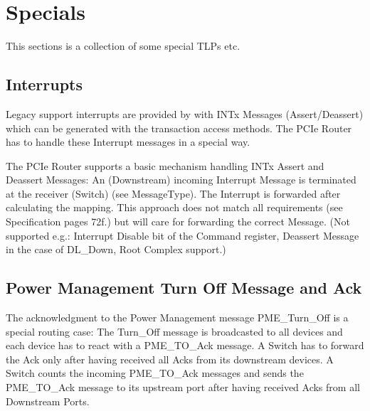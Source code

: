 \section{Specials}
\label{sec:Specials}

This sections is a collection of some special TLPs etc.

\subsection{Interrupts}
Legacy support interrupts are provided by with INTx Messages (Assert/Deassert) which can be generated with the transaction access methods. The PCIe Router has to handle these Interrupt messages in a special way.

The PCIe Router supports a basic mechanism handling INTx Assert and Deassert Messages: An (Downstream) incoming Interrupt Message is terminated at the receiver (Switch) (see MessageType). The Interrupt is forwarded after calculating the mapping. This approach does not match all requirements (see Specification pages 72f.) but will care for forwarding the correct Message. (Not supported e.g.: Interrupt Disable bit of the Command register, Deassert Message in the case of DL\_Down, Root Complex support.)

\subsection{Power Management Turn Off Message and Ack}
The acknowledgment to the Power Management message PME\_Turn\_Off is a special routing case: The Turn\_Off message is broadcasted to all devices and each device has to react with a PME\_TO\_Ack message. A Switch has to forward the Ack only after having received all Acks from its downstream devices. A Switch counts the incoming PME\_TO\_Ack messages and sends the PME\_TO\_Ack message to its upstream port after having received Acks from all Downstream Ports.
